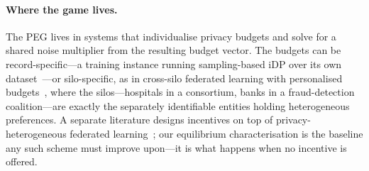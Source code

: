 \paragraph{Where the game lives.} The \ac{PEG} lives in systems that
individualise privacy budgets and solve for a shared noise multiplier
from the resulting budget vector. The budgets can be
record-specific---a training instance running sampling-based
\ac{iDP} over its own dataset~\cite{boenisch2023have}---or
silo-specific, as in cross-silo federated learning with personalised
budgets~\cite{liu2024crosssilo, mcmahan2017communication,
geyer2017differentially, kairouz2021advances}, where the
silos---hospitals in a consortium, banks in a fraud-detection
coalition---are exactly the separately identifiable entities holding
heterogeneous preferences. A separate literature designs
incentives on top of privacy-heterogeneous federated
learning~\cite{li2024fedpcs, donahue2021optimality, tu2025idhfl,
ma2024evolutionary}; our equilibrium characterisation is the baseline
any such scheme must improve upon---it is what happens when no
incentive is offered.
